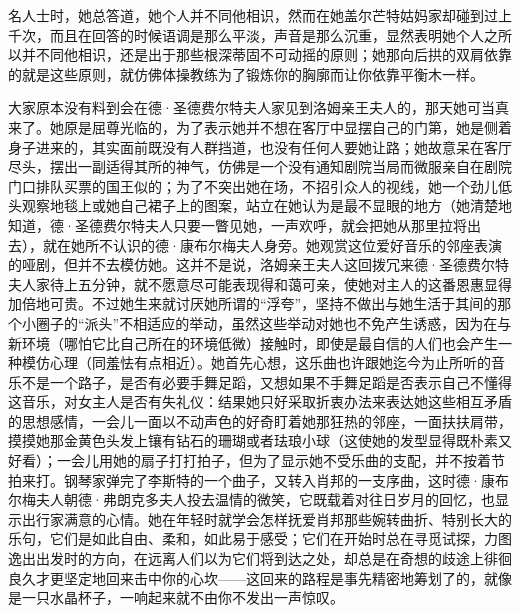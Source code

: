 名人士时，她总答道，她个人并不同他相识，然而在她盖尔芒特姑妈家却碰到过上千次，而且在回答的时候语调是那么平淡，声音是那么沉重，显然表明她个人之所以并不同他相识，还是出于那些根深蒂固不可动摇的原则；她那向后拱的双肩依靠的就是这些原则，就仿佛体操教练为了锻炼你的胸廓而让你依靠平衡木一样。
\par 大家原本没有料到会在德·圣德费尔特夫人家见到洛姆亲王夫人的，那天她可当真来了。她原是屈尊光临的，为了表示她并不想在客厅中显摆自己的门第，她是侧着身子进来的，其实面前既没有人群挡道，也没有任何人要她让路；她故意呆在客厅尽头，摆出一副适得其所的神气，仿佛是一个没有通知剧院当局而微服亲自在剧院门口排队买票的国王似的；为了不突出她在场，不招引众人的视线，她一个劲儿低头观察地毯上或她自己裙子上的图案，站立在她认为是最不显眼的地方（她清楚地知道，德·圣德费尔特夫人只要一瞥见她，一声欢呼，就会把她从那里拉将出去），就在她所不认识的德·康布尔梅夫人身旁。她观赏这位爱好音乐的邻座表演的哑剧，但并不去模仿她。这并不是说，洛姆亲王夫人这回拨冗来德·圣德费尔特夫人家待上五分钟，就不愿意尽可能表现得和蔼可亲，使她对主人的这番恩惠显得加倍地可贵。不过她生来就讨厌她所谓的“浮夸”，坚持不做出与她生活于其间的那个小圈子的“派头”不相适应的举动，虽然这些举动对她也不免产生诱惑，因为在与新环境（哪怕它比自己所在的环境低微）接触时，即使是最自信的人们也会产生一种模仿心理（同羞怯有点相近）。她首先心想，这乐曲也许跟她迄今为止所听的音乐不是一个路子，是否有必要手舞足蹈，又想如果不手舞足蹈是否表示自己不懂得这音乐，对女主人是否有失礼仪：结果她只好采取折衷办法来表达她这些相互矛盾的思想感情，一会儿一面以不动声色的好奇盯着她那狂热的邻座，一面扶扶肩带，摸摸她那金黄色头发上镶有钻石的珊瑚或者珐琅小球（这使她的发型显得既朴素又好看）；一会儿用她的扇子打打拍子，但为了显示她不受乐曲的支配，并不按着节拍来打。钢琴家弹完了李斯特的一个曲子，又转入肖邦的一支序曲，这时德·康布尔梅夫人朝德·弗朗克多夫人投去温情的微笑，它既载着对往日岁月的回忆，也显示出行家满意的心情。她在年轻时就学会怎样抚爱肖邦那些婉转曲折、特别长大的乐句，它们是如此自由、柔和，如此易于感受；它们在开始时总在寻觅试探，力图逸出出发时的方向，在远离人们以为它们将到达之处，却总是在奇想的歧途上徘徊良久才更坚定地回来击中你的心坎——这回来的路程是事先精密地筹划了的，就像是一只水晶杯子，一响起来就不由你不发出一声惊叹。
